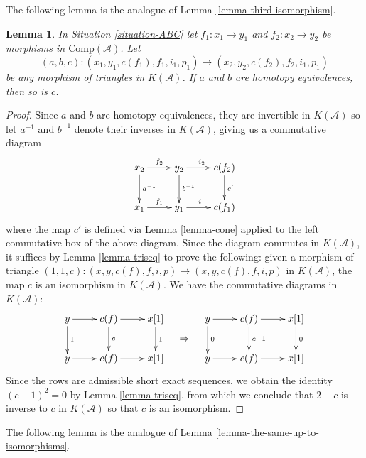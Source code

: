 \documentclass{stacks-project}
\theoremstyle{plain}
\newtheorem{lemma}[subsection]{Lemma}
\theoremstyle{definition}
\theoremstyle{remark}
\numberwithin{equation}{subsection}
\begin{document}
\noindent
The following lemma is the analogue of
Lemma \ref{lemma-third-isomorphism}.

\begin{lemma}
\label{lemma-analogue-third-isomorphism}
In Situation \ref{situation-ABC} let $f_1 : x_1 \to y_1$ and
$f_2 : x_2 \to y_2$ be morphisms in $\text{Comp}(\mathcal{A})$. Let 
$$
(a,b,c): (x_1,y_1,c(f_1), f_1, i_1, p_1) \to (x_2,y_2, c(f_2), f_2, i_1, p_1)
$$
be any morphism of triangles in $K(\mathcal{A})$.
If $a$ and $b$ are homotopy equivalences, then so is $c$. 
\end{lemma}

\begin{proof}
Since $a$ and $b$ are homotopy equivalences, they are invertible in
$K(\mathcal{A})$ so let $a^{-1}$ and $b^{-1}$ denote their inverses
in $K(\mathcal{A})$, giving us a commutative diagram 
$$
\xymatrix{
x_2\ar[d]^{a^{-1}}\ar[r]^{f_2} &
y_2\ar[d]^{b^{-1}}\ar[r]^{i_2} &
c(f_2)\ar[d]^{c'} \\
x_1\ar[r]^{f_1} &
y_1 \ar[r]^{i_1} &
c(f_1)
}
$$
where the map $c'$ is defined via Lemma \ref{lemma-cone} applied to the left
commutative box of the above diagram. Since the diagram commutes
in $K(\mathcal{A})$, it suffices by Lemma \ref{lemma-triseq} to
prove the following: given a morphism of triangle
$(1,1,c): (x,y,c(f),f,i,p)\to (x,y,c(f),f,i,p)$
in $K(\mathcal{A})$, the map $c$ is an isomorphism in
$K(\mathcal{A})$. We have the commutative diagrams in $K(\mathcal{A})$:
$$
\vcenter{
\xymatrix{
y\ar[d]^{1}\ar[r] &
c(f)\ar[d]^{c}\ar[r] &
x[1]\ar[d]^{1} \\
y\ar[r] &
c(f) \ar[r] &
x[1]
}
}
\quad\Rightarrow\quad
\vcenter{
\xymatrix{
y\ar[d]^{0}\ar[r] &
c(f)\ar[d]^{c-1}\ar[r] &
x[1]\ar[d]^{0} \\
y\ar[r] &
c(f) \ar[r] &
x[1]
}
}
$$
Since the rows are admissible short exact sequences, we obtain
the identity $(c-1)^2 = 0$ by Lemma \ref{lemma-triseq}, from
which we conclude that $2-c$ is inverse to $c$ in $K(\mathcal{A})$
so that $c$ is an isomorphism. 
\end{proof}

\noindent
The following lemma is the analogue of
Lemma \ref{lemma-the-same-up-to-isomorphisms}.
\end{document}
